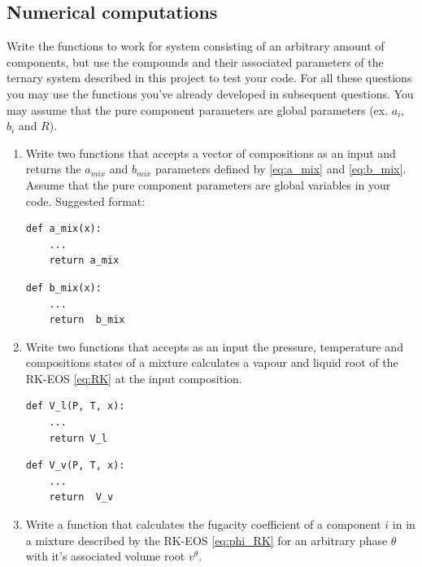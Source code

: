 \documentclass[12pt, A4paper]{article}
\newcounter{variables}
\newcounter{parameters}
\begin{document}
\subsection{Numerical computations}
Write the functions to work for system consisting of an arbitrary amount of components, but use the compounds and their associated parameters of the ternary system described in this project to test your code. For all these questions you may use the functions you've already developed in subsequent questions. You may assume that the pure component parameters are global parameters (ex. $a_i$, $b_i$ and $R$).
\begin{enumerate}
\item  Write two functions that accepts a vector of compositions as an input and returns the $a_{mix}$ and $b_{mix}$ parameters defined by \autoref{eq:a_mix} and \autoref{eq:b_mix}. Assume that the pure component parameters are global variables in your code.  Suggested format:
   
\begin{lstlisting}
def a_mix(x):
    ...
    return a_mix
\end{lstlisting}

\begin{lstlisting}
def b_mix(x):
    ...
    return  b_mix
\end{lstlisting}

\begin{flushright} 
\end{flushright}

\item  Write two functions that accepts as an input the pressure, temperature and compositions states of a mixture calculates a vapour and liquid root of the RK-EOS  \autoref{eq:RK} at the input composition.
   
\begin{lstlisting}
def V_l(P, T, x):
    ...
    return V_l
\end{lstlisting}

\begin{lstlisting}
def V_v(P, T, x):
    ...
    return  V_v
\end{lstlisting}

\begin{flushright} 
\end{flushright}

\item  Write a function that calculates the fugacity coefficient of a component $i$ in in a mixture described by the RK-EOS  \autoref{eq:phi_RK} for an arbitrary phase $\theta$ with it's associated volume root $v^\theta$.
   

\end{enumerate}
\end{document}
